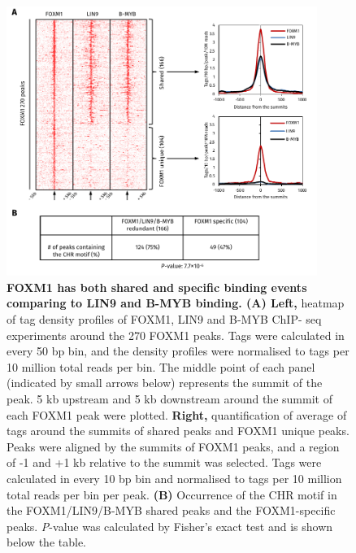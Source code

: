 \begin{figure}[!h]
    \centering
    \includegraphics[width=0.9\textwidth]{chapter3/figures_foxm1/fig29.pdf}
    \caption[FOXM1 has both shared and specific binding events comparing to LIN9 and B-MYB binding]{\textbf{FOXM1 has both shared and specific binding events comparing to LIN9 and B-MYB binding. (A) Left,} heatmap of tag density profiles of FOXM1, LIN9 and B-MYB ChIP- seq experiments around the 270 FOXM1 peaks. Tags were calculated in every 50 bp bin, and the density profiles were normalised to tags per 10 million total reads per bin. The middle point of each panel (indicated by small arrows below) represents the summit of the peak. 5 kb upstream and 5 kb downstream around the summit of each FOXM1 peak were plotted. \textbf{Right,} quantification of average of tags around the summits of shared peaks and FOXM1 unique peaks. Peaks were aligned by the summits of FOXM1 peaks, and a region of -1 and +1 kb relative to the summit was selected. Tags were calculated in every 10 bp bin and normalised to tags per 10 million total reads per bin per peak. \textbf{(B)} Occurrence of the CHR motif in the FOXM1/LIN9/B-MYB shared peaks and the FOXM1-specific peaks. \textit{P}-value was calculated by Fisher's exact test and is shown below the table.}
    \label{fig:fig29}
\end{figure}

